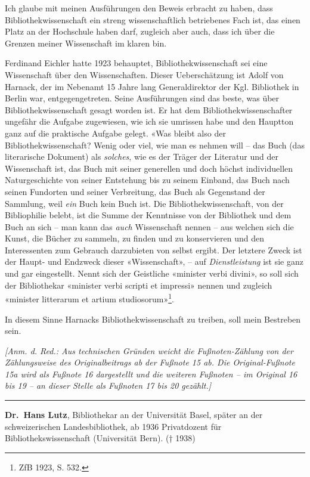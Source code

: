 \documentclass[a4paper,
fontsize=11pt,
oneside,
numbers=noperiodatend,
parskip=half-,
bibliography=totoc,
final
]{scrartcl}
\begin{document}
Ich glaube mit meinen Ausführungen den Beweis erbracht zu haben, dass
Bibliothekwissenschaft ein streng wissenschaftlich betriebenes Fach ist,
das einen Platz an der Hochschule haben darf, zugleich aber auch, dass
ich über die Grenzen meiner Wissenschaft im klaren bin.

Ferdinand Eichler hatte 1923 behauptet, Bibliothekwissenschaft sei eine
Wissenschaft über den Wissenschaften. Dieser Ueberschätzung ist Adolf
von Harnack, der im Nebenamt 15 Jahre lang Generaldirektor der Kgl.
Bibliothek in Berlin war, entgegengetreten. Seine Ausführungen sind das
beste, was über Bibliothekwissenschaft gesagt worden ist. Er hat dem
Bibliothekwissenschafter ungefähr die Aufgabe zugewiesen, wie ich sie
umrissen habe und den Hauptton ganz auf die praktische Aufgabe gelegt.
«Was bleibt also der Bibliothekwissenschaft? Wenig oder viel, wie man es
nehmen will -- das Buch (das literarische Dokument) als \emph{solches},
wie es der Träger der Literatur und der Wissenschaft ist, das Buch mit
seiner generellen und doch höchst individuellen Naturgeschichte von
seiner Entstehung bis zu seinem Einband, das Buch nach seinen Fundorten
und seiner Verbreitung, das Buch als Gegenstand der Sammlung, weil
\emph{ein} Buch kein Buch ist. Die Bibliothekwissenschaft, von der
Bibliophilie belebt, ist die Summe der Kenntnisse von der Bibliothek und
dem Buch an sich -- man kann das \emph{auch} Wissenschaft nennen -- aus
welchen sich die Kunst, die Bücher zu sammeln, zu finden und zu
konservieren und den Interessenten zum Gebrauch darzubieten von selbst
ergibt. Der letztere Zweck ist der Haupt- und Endzweck dieser
«Wissenschaft», -- auf \emph{Dienstleistung} ist sie ganz und gar
eingestellt. Nennt sich der Geistliche «minister verbi divini», so soll
sich der Bibliothekar «minister verbi scripti et impressi» nennen und
zugleich «minister litterarum et artium studiosorum»\footnote{ZfB 1923,
  S. 532.}.

In diesem Sinne Harnacks Bibliothekwissenschaft zu treiben, soll mein
Bestreben sein.

\vspace*{2em}

\emph{{[}Anm. d. Red.: Aus technischen Gründen weicht die
Fußnoten-Zählung von der Zählungsweise des Originalbeitrags ab der
Fußnote 15 ab. Die Original-Fußnote 15a wird als Fußnote 16 dargestellt
und die weiteren Fußnoten -- im Original 16 bis 19 -- an dieser Stelle als
Fußnoten 17 bis 20 gezählt.{]}}

\begin{center}\rule{0.5\linewidth}{\linethickness}\end{center}

\textbf{Dr.~Hans Lutz}, Bibliothekar an der Universität Basel, später an der schweizerischen Landesbibliothek, ab 1936 Privatdozent für
Bibliothekswissenschaft (Universität Bern). († 1938)
\end{document}
